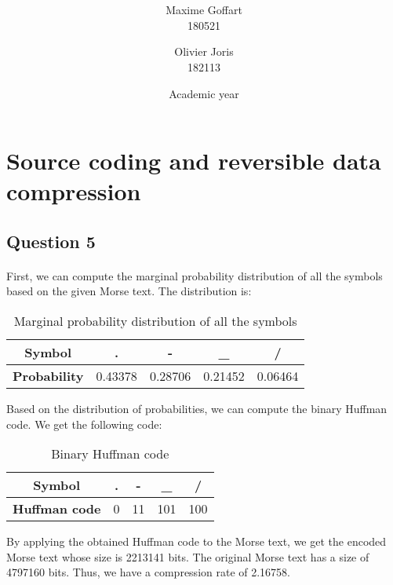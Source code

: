 \documentclass[a4paper, 11pt, oneside]{article}
\title{\ClassName\\\vspace*{0.8cm}\ProjectName\vspace{1cm}}
\author{Maxime Goffart \\180521 \and Olivier Joris\\182113}
\date{\vspace{1cm}Academic year \AcademicYear}
\begin{document}
\begin{titlingpage}
{\let\newpage\relax\maketitle}
\end{titlingpage}

\thispagestyle{empty}
\newpage






\section{Source coding and reversible data compression}

\subsection{Question 5}
\paragraph{}First, we can compute the marginal probability distribution of all the symbols based on the given Morse text. The distribution is:
\begin{table}[H]
    \centering
    \begin{tabular}{|c|c|c|c|c|}
    \hline
    \textbf{Symbol}      & . & - & \_ & / \\ \hline
    \textbf{Probability} & 0.43378 & 0.28706 & 0.21452 & 0.06464 \\ \hline
    \end{tabular}
    \caption{Marginal probability distribution of all the symbols}
\end{table}
Based on the distribution of probabilities, we can compute the binary Huffman code. We get the following code:
\begin{table}[H]
    \centering
    \begin{tabular}{|c|c|c|c|c|}
    \hline
    \textbf{Symbol}      & . & - & \_ & / \\ \hline
    \textbf{Huffman code} & 0 & 11 & 101 & 100 \\ \hline
    \end{tabular}
    \caption{Binary Huffman code}
\end{table}
By applying the obtained Huffman code to the Morse text, we get the encoded Morse text whose size is 2213141 bits. The original Morse text has a size of 4797160 bits. Thus, we have a compression rate of 2.16758.
\end{document}
